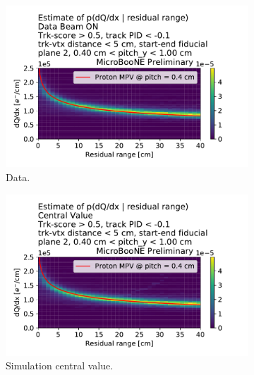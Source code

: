 \begin{figure}[H] 
\begin{center}
    \begin{subfigure}[b]{0.32\textwidth}
    \centering
    \includegraphics[width=1.00\textwidth]{detsys/calorimetry_dqdx/beam_on_04_pitch_y_10.pdf}
    \caption{\label{fig:syst:dedx_vs_rr:data} Data.}
    \end{subfigure}
    \begin{subfigure}[b]{0.32\textwidth}
    \centering
    \includegraphics[width=1.00\textwidth]{detsys/calorimetry_dqdx/bnb_nu_mod_04_pitch_y_10.pdf}
    \caption{\label{fig:syst:dedx_vs_rr:cv} Simulation central value.}
    \end{subfigure}
    \begin{subfigure}[b]{0.32\textwidth}
    \centering

\end{subfigure}
\end{center}
\end{figure}

